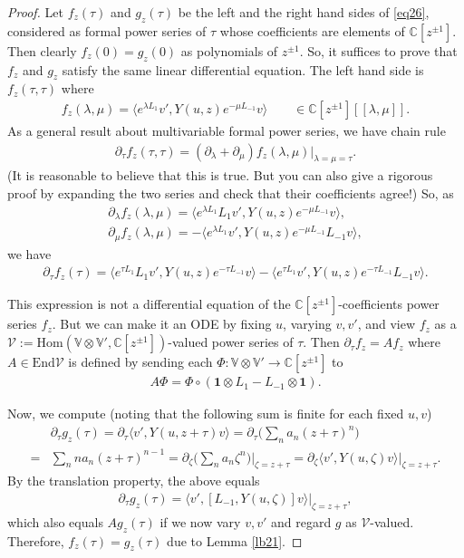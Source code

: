 \documentclass[12pt,a4paper,notitlepage]{article}
\theoremstyle{definition}
\theoremstyle{plain}
\newcommand{\mc}{\mathcal}
\newcommand{\End}{\mathrm{End}} %
\newcommand{\id}{\mathbf{1}}
\newcommand{\Hom}{\mathrm{Hom}}
\newcommand{\bigbk}[1]{\big\langle {#1}\big\rangle}
\newcommand{\Vbb}{\mathbb V}
\newcommand{\Cbb}{\mathbb C}
\numberwithin{equation}{section}
\begin{document}
\begin{proof}
Let $f_z(\tau)$ and $g_z(\tau)$ be the left and the right hand sides of \eqref{eq26}, considered as formal power series of $\tau$ whose coefficients are elements of $\Cbb[z^{\pm 1}]$. Then clearly $f_z(0)=g_z(0)$ as polynomials of $z^{\pm1}$. So, it suffices to prove that $f_z$ and $g_z$ satisfy the same linear differential equation. The left hand side is $f_z(\tau,\tau)$ where
\begin{align*}
f_z(\lambda,\mu)=\bigbk{e^{\lambda L_1}v',Y(u,z)e^{-\mu L_{-1}}v}\qquad\in\Cbb[z^{\pm1}][[\lambda,\mu]].
\end{align*}
As a general result about multivariable formal power series, we have chain rule
\begin{align*}
\partial_\tau f_z(\tau,\tau)=(\partial_\lambda+\partial_\mu)f_z(\lambda,\mu)\big|_{\lambda=\mu=\tau}.	
\end{align*}
(It is reasonable to believe that this is true. But you can also give a rigorous proof by expanding the two series  and check that their coefficients agree!) So, as
\begin{gather*}
\partial_\lambda f_z(\lambda,\mu)=\bigbk{e^{\lambda L_1}L_1v',Y(u,z)e^{-\mu L_{-1}}v},\\
\partial_\mu f_z(\lambda,\mu)=-\bigbk{e^{\lambda L_1}v',Y(u,z)e^{-\mu L_{-1}}L_{-1}v},	
\end{gather*}
we have
\begin{align*}
\partial_\tau f_z(\tau)=\bigbk{e^{\tau L_1}L_1v',Y(u,z)e^{-\tau L_{-1}}v}-\bigbk{e^{\tau L_1}v',Y(u,z)e^{-\tau L_{-1}}L_{-1}v}.
\end{align*}

This expression is not a differential equation of the $\Cbb[z^{\pm1}]$-coefficients power series $f_z$. But we can make it an ODE by fixing $u$, varying $v,v'$, and view $f_z$ as a $\mc V:=\Hom(\Vbb\otimes\Vbb',\Cbb[z^{\pm1}])$-valued power series of $\tau$. Then $\partial_\tau f_z=Af_z$ where $A\in\End\mc V$ is defined by sending each $\Phi:\Vbb\otimes\Vbb'\rightarrow\Cbb[z^{\pm1}]$ to
\begin{align*}
A\Phi=\Phi\circ (\id\otimes L_1-L_{-1}\otimes\id).
\end{align*}


Now, we compute (noting that the following sum is finite for each fixed $u,v$)
\begin{align*}
&\partial_\tau g_z(\tau)=\partial_\tau \bigbk{v',Y(u,z+\tau)v}=\partial_\tau\Big(\sum_n a_n(z+\tau)^n\Big)\\
=& 	\sum_n na_n(z+\tau)^{n-1}=\partial_\zeta\Big(\sum_n a_n\zeta^n\Big)\Big|_{\zeta=z+\tau}=\partial_\zeta \bigbk{v',Y(u,\zeta)v}\big|_{\zeta=z+\tau}.
\end{align*}
By the translation property, the above equals
\begin{align*}
\partial_\tau g_z(\tau)=	\bigbk{v',[L_{-1},Y(u,\zeta)]v}\big|_{\zeta=z+\tau},
\end{align*}
which also equals $Ag_z(\tau)$ if we now vary $v,v'$ and regard $g$ as $\mc V$-valued. Therefore, $f_z(\tau)=g_z(\tau)$ due to Lemma \ref{lb21}.
\end{proof}
\end{document}
